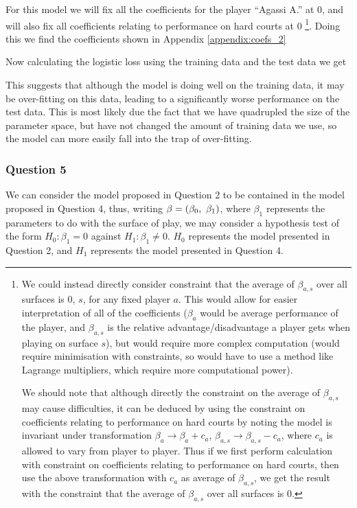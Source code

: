 \documentclass[11pt]{article} %
\let\originalleft\left
\let\originalright\right
\renewcommand{\left}{\mathopen{}\mathclose\bgroup\originalleft}
\renewcommand{\right}{\aftergroup\egroup\originalright}
\begin{document}
For this model we will fix all the coefficients for the player ``Agassi A.'' at 0, and will also fix all coefficients relating to performance on hard courts at 0%
\footnote{
We could instead directly consider constraint that the average of $\beta_{a, s}$ over all surfaces is 0, $s$, for any fixed player $a$. This would allow for easier interpretation of all of the coefficients ($\beta_a$ would be average performance of the player, and $\beta_{a, s}$ is the relative advantage/disadvantage a player gets when playing on surface $s$), but would require more complex computation (would require minimisation with constraints, so would have to use a method like Lagrange multipliers, which require more computational power).

We should note that although directly the constraint on the average of $\beta_{a,s}$ may cause difficulties, it can be deduced by using the constraint on coefficients relating to performance on hard courts by noting the model is invariant under transformation $\beta_a \to \beta_a + c_a$, $\beta_{a, s} \to \beta_{a, s} - c_a$, where $c_a$ is allowed to vary from player to player. Thus if we first perform calculation with constraint on coefficients relating to performance on hard courts, then use the above transformation with $c_a$ as average of $\beta_{a, s}$, we get the result with the constraint that the average of $\beta_{a, s}$ over all surfaces is 0.
}. Doing this we find the coefficients shown in Appendix \ref{appendix:coefs_2}

Now calculating the logistic loss using the training data and the test data we get


This suggests that although the model is doing well on the training data, it may be over-fitting on this data, leading to a significantly worse performance on the test data. This is most likely due the fact that we have quadrupled the size of the parameter space, but have not changed the amount of training data we use, so the model can more easily fall into the trap of over-fitting.

\subsubsection*{Question 5}

We can consider the model proposed in Question 2 to be contained in the model proposed in Question 4, thus, writing $\beta = \left(\beta_0,\ \beta_1 \right)$, where $\beta_1$ represents the parameters to do with the surface of play, we may consider a hypothesis test of the form $H_0 : \beta_1 = 0$ against $H_1 : \beta_1 \neq 0$. $H_0$ represents the model presented in Question 2, and $H_1$ represents the model presented in Question 4.
\end{document}

